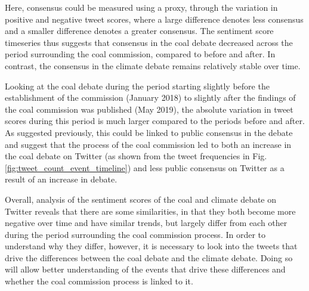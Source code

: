 \documentclass[12pt,onecolumn,twoside]{layout}
\begin{document}
Here, consensus could be measured using a proxy, through the variation in positive and negative tweet scores, where a large difference denotes less consensus and a smaller difference denotes a greater consensus. The sentiment score timeseries thus suggests that consensus in the coal debate decreased across the period surrounding the coal commission, compared to before and after. In contrast, the consensus in the climate debate remains relatively stable over time.

Looking at the coal debate during the period starting slightly before the establishment of the commission (January 2018) to slightly after the findings of the coal commission was published (May 2019), the absolute variation in tweet scores during this period is much larger compared to the periods before and after. As suggested previously, this could be linked to public consensus in the debate and suggest that the process of the coal commission led to both an increase in the coal debate on Twitter (as shown from the tweet frequencies in Fig. \ref{fig:tweet_count_event_timeline}) and less public consensus on Twitter as a result of an increase in debate.

Overall, analysis of the sentiment scores of the coal and climate debate on Twitter reveals that there are some similarities, in that they both become more negative over time and have similar trends, but largely differ from each other during the period surrounding the coal commission process. In order to understand why they differ, however, it is necessary to look into the tweets that drive the differences between the coal debate and the climate debate. Doing so will allow better understanding of the events that drive these differences and whether the coal commission process is linked to it.
\end{document}
